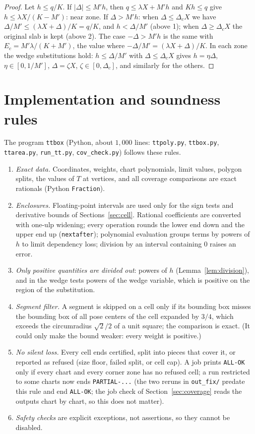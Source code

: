 \documentclass[11pt]{amsart}
\theoremstyle{definition}
\theoremstyle{remark}
\begin{document}
\begin{proof}
Let $h\le q/K$. If $|\Delta|\le M'h$, then $q\le\lambda X+M'h$ and $Kh\le q$ give $h\le\lambda X/(K-M')$: near zone.
If $\Delta>M'h$: when $\Delta\le\Delta_cX$ we have $\Delta/M'\le(\lambda X+\Delta)/K=q/K$, and $h<\Delta/M'$ (above 1);
when $\Delta\ge\Delta_cX$ the original slab is kept (above 2). The case $-\Delta>M'h$ is the same with
$E_c=M'\lambda/(K+M')$, the value where $-\Delta/M'=(\lambda X+\Delta)/K$. In each zone the wedge substitutions hold:
$h\le\Delta/M'$ with $\Delta\le\Delta_cX$ gives $h=\eta\Delta$, $\eta\in[0,1/M']$, $\Delta=\zeta X$,
$\zeta\in[0,\Delta_c]$, and similarly for the others.
\end{proof}

\section{Implementation and soundness rules}\label{sec:impl}

The program \texttt{ttbox} (Python, about $1{,}000$ lines: \texttt{ttpoly.py}, \texttt{ttbox.py}, \texttt{ttarea.py},
\texttt{run\_tt.py}, \texttt{cov\_check.py}) follows these rules.
\begin{enumerate}
\item \emph{Exact data.} Coordinates, weights, chart polynomials, limit values, polygon splits, the values of $T$ at
vertices, and all coverage comparisons are exact rationals (Python \texttt{Fraction}).
\item \emph{Enclosures.} Floating-point intervals are used only for the sign tests and derivative bounds of
Sections~\ref{sec:cell}. Rational coefficients are converted with one-ulp widening; every operation rounds the lower
end down and the upper end up (\texttt{nextafter}); polynomial evaluation groups terms by powers of $h$ to limit
dependency loss; division by an interval containing $0$ raises an error.
\item \emph{Only positive quantities are divided out}: powers of $h$ (Lemma~\ref{lem:division}), and in the wedge
tests powers of the wedge variable, which is positive on the region of the substitution.
\item \emph{Segment filter.} A segment is skipped on a cell only if its bounding box misses the bounding box of all
pose centers of the cell expanded by $3/4$, which exceeds the circumradius $\sqrt2/2$ of a unit square; the
comparison is exact. (It could only make the bound weaker: every weight is positive.)
\item \emph{No silent loss.} Every cell ends certified, split into pieces that cover it, or reported as refused (size
floor, failed split, or cell cap). A job prints \texttt{ALL-OK} only if every chart and every corner zone has no
refused cell; a run restricted to some charts now ends \texttt{PARTIAL-...} (the two reruns in \texttt{out\_fix/}
predate this rule and end \texttt{ALL-OK}; the job check of Section~\ref{sec:coverage} reads the outputs chart by
chart, so this does not matter).
\item \emph{Safety checks} are explicit exceptions, not assertions, so they cannot be disabled.
\end{enumerate}
\end{document}
